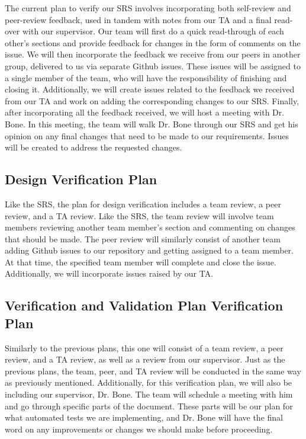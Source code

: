 \documentclass[12pt, titlepage]{article}
\begin{document}
The current plan to verify our SRS involves incorporating both self-review and peer-review feedback, used in tandem with notes from our TA 
and a final read-over with our supervisor. Our team will first do a quick read-through of each other's sections and provide feedback for changes
in the form of comments on the issue. We will then incorporate the feedback we receive from our peers in another group, delivered to us via 
separate Github issues. These issues will be assigned to a single member of the team, who will have the responsibility of finishing and closing it.
Additionally, we will create issues related to the feedback we received from our TA and work on adding the corresponding changes to our SRS. 
Finally, after incorporating all the feedback received, we will host a meeting with Dr. Bone. In this meeting, the team will walk Dr. Bone through
our SRS and get his opinion on any final changes that need to be made to our requirements. Issues will be created to address the requested changes.


\subsection{Design Verification Plan}

Like the SRS, the plan for design verification includes a team review, a peer review, and a TA review. Like the SRS, the 
team review will involve team members reviewing another team member's section and commenting on changes that should be made. 
The peer review will similarly consist of another team adding Github issues to our repository and getting assigned to a team member. 
At that time, the specified team member will complete and close the issue. Additionally, we will incorporate issues raised by our TA. 

\subsection{Verification and Validation Plan Verification Plan}

Similarly to the previous plans, this one will consist of a team review, a peer review, and a TA review, as well as a review from our
supervisor. Just as the previous plans, the team, peer, and TA review will be conducted in the same way as previously mentioned. Additionally,
for this verification plan, we will also be including our supervisor, Dr. Bone. The team will schedule a meeting with him and go through
specific parts of the document. These parts will be our plan for what automated tests we are implementing, and Dr. Bone will have the final word
on any improvements or changes we should make before proceeding.
\end{document}
